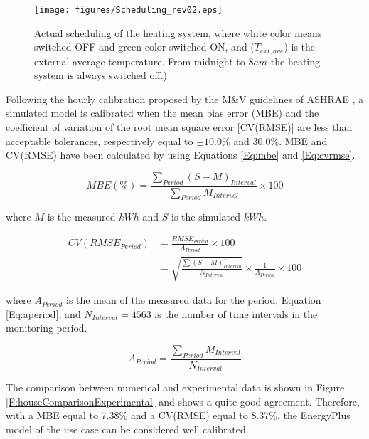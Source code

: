 \begin{figure}[h!]
	\begin{center}
		\texttt{[image: figures/Scheduling\_rev02.eps]}
		\caption{Actual scheduling of the heating system, where white color means switched OFF and green color switched ON, and ($T_{ext,ave}$) is the external average temperature. From midnight to $8am$ the heating system is always switched off.)}
		\captionsetup{justification=centering}
		\label{F:houseActualScheduling}
	\end{center}
\end{figure}
Following the hourly calibration proposed by the M\&V guidelines of ASHRAE \cite{USDOE}, a simulated model is calibrated when the mean bias error (MBE) and the coefficient of variation of the root mean square error [CV(RMSE)] are less than acceptable tolerances, respectively equal to $\pm 10.0\%$ and $30.0\%$. MBE and CV(RMSE) have been calculated by using Equations \eqref{Eq:mbe} and \eqref{Eq:cvrmse}.

\begin{equation}\label{Eq:mbe}
MBE(\%) = \frac{\sum_{Period}{(S-M)_{Interval}}}{\sum_{Period}{M_{Interval}}} \times 100
\end{equation}

where $M$ is the measured $kWh$ and $S$ is the simulated $kWh$.

\begin{align}\label{Eq:cvrmse}
\nonumber CV(RMSE_{Period}) &= \frac{RMSE_{Period}}{A_{Period}} \times 100 \\
				            &= \sqrt{\frac{\sum{(S-M)^2_{Interval}}}{N_{Interval}}} \times \frac 1{A_{Period}} \times 100
\end{align}

where $A_{Period}$ is the mean of the measured data for the period, Equation \eqref{Eq:aperiod}, and $N_{Interval} = 4563$ is the number of time intervals in the monitoring period.

\begin{equation}\label{Eq:aperiod}
A_{Period} = \frac{\sum_{Period}{M_{Interval}}}{N_{Interval}}
\end{equation}

The comparison between numerical and experimental data is shown in Figure \ref{F:houseComparisonExperimental} and shows a quite good agreement. Therefore, with a MBE equal to $7.38\%$ and a CV(RMSE) equal to $8.37\%$, the EnergyPlus model of the use case can be considered well calibrated.  

